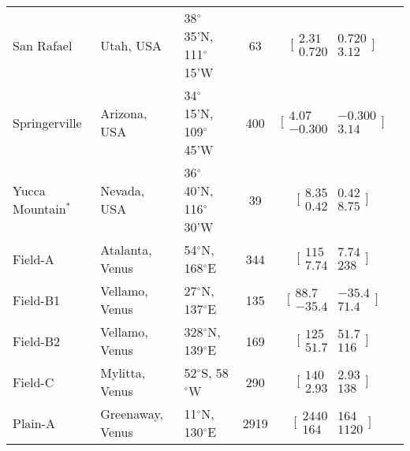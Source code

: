\begin{table}
\begin{tabular}{p{2cm} p{2.5cm} p{2cm} c c p{4cm}}
San Rafael	&	Utah, USA	&	38$^{\circ}$35'N, 111$^{\circ}$15'W	&	63	&	$\bigl[\begin{smallmatrix} 2.31&0.720\\0.720&3.12 \end{smallmatrix}\bigr]$	&	\citet{kiyosugi2012relationship}\\
Springerville &	Arizona, USA	&	34$^{\circ}$15'N, 109$^{\circ}$45'W	&	400	&	$\bigl[\begin{smallmatrix} 4.07&-0.300\\-0.300&3.14 \end{smallmatrix}\bigr]$	&	\citet{kiyosugi2012relationship,condit2010dynamic}\\
Yucca Mountain$^*$ &	Nevada, USA	&	36$^{\circ}$40'N, 116$^{\circ}$30'W	&	39	&	$\bigl[\begin{smallmatrix} 8.35&0.42\\0.42&8.75 \end{smallmatrix}\bigr]$	&	\citet{kiyosugi2012relationship,connor1995three}\\
Field-A	&	Atalanta, Venus	&	54$^{\circ}$N, 168$^{\circ}$E	&	344	&	$\bigl[\begin{smallmatrix} 115&7.74\\7.74&238 \end{smallmatrix}\bigr]$	&	\citet{miller2012shield}\\
Field-B1	&	Vellamo, Venus	&	27$^{\circ}$N, 137$^{\circ}$E	&	135	&	$\bigl[\begin{smallmatrix} 88.7&-35.4\\-35.4&71.4 \end{smallmatrix}\bigr]$	&	\citet{miller2012shield}\\
Field-B2	&	Vellamo, Venus	&	328$^{\circ}$N, 139$^{\circ}$E	&	169	&	$\bigl[\begin{smallmatrix} 125&51.7\\51.7&116 \end{smallmatrix}\bigr]$	&	\citet{miller2012shield}\\
Field-C	&	Mylitta, Venus	&	52$^{\circ}$S, 58$^{\circ}$W	&	290	&	$\bigl[\begin{smallmatrix} 140&2.93\\2.93&138 \end{smallmatrix}\bigr]$	&	\citet{miller2012shield}\\
Plain-A	&	Greenaway, Venus	&	11$^{\circ}$N, 130$^{\circ}$E	&	2919	&	$\bigl[\begin{smallmatrix} 2440&164\\164&1120 \end{smallmatrix}\bigr]$	&	\citet{miller2012shield}\\

\end{tabular}
\end{table}
